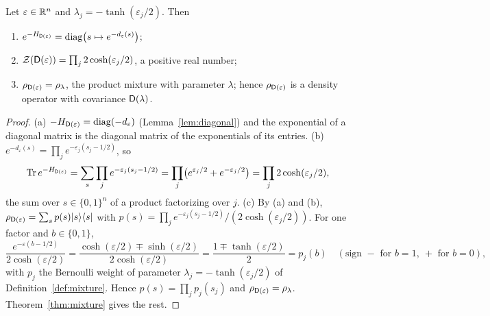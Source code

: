 \begin{lemma}\label{lem:block-exp}
Let $\varepsilon\in\mathbb R^n$ and $\lambda_j=-\tanh(\varepsilon_j/2)$. Then
\begin{enumerate}
\item[(a)] $e^{-H_{\mathsf D(\varepsilon)}}=\operatorname{diag}\bigl(s\mapsto e^{-d_\varepsilon(s)}\bigr)$;
\item[(b)] $\mathcal Z(\mathsf D(\varepsilon))=\prod_j2\cosh(\varepsilon_j/2)$, a positive real number;
\item[(c)] $\rho_{\mathsf D(\varepsilon)}=\rho_\lambda$, the product mixture with parameter
$\lambda$; hence $\rho_{\mathsf D(\varepsilon)}$ is a density operator with covariance $\mathsf D(\lambda)$.
\end{enumerate}
\end{lemma}
\begin{proof}
(a) $-H_{\mathsf D(\varepsilon)}=\operatorname{diag}(-d_\varepsilon)$ (Lemma~\ref{lem:diagonal}) and the
exponential of a diagonal matrix is the diagonal matrix of the exponentials of its entries.
(b) $e^{-d_\varepsilon(s)}=\prod_je^{-\varepsilon_j(s_j-1/2)}$, so
\[
 \operatorname{Tr} e^{-H_{\mathsf D(\varepsilon)}}=\sum_s\prod_je^{-\varepsilon_j(s_j-1/2)}
 =\prod_j\bigl(e^{\varepsilon_j/2}+e^{-\varepsilon_j/2}\bigr)=\prod_j2\cosh(\varepsilon_j/2),
\]
the sum over $s\in\{0,1\}^n$ of a product factorizing over $j$.
(c) By (a) and (b), $\rho_{\mathsf D(\varepsilon)}=\sum_sp(s)|s\rangle\langle s|$ with
$p(s)=\prod_je^{-\varepsilon_j(s_j-1/2)}/(2\cosh(\varepsilon_j/2))$. For one factor and
$b\in\{0,1\}$,
\[
 \frac{e^{-\varepsilon(b-1/2)}}{2\cosh(\varepsilon/2)}
 =\frac{\cosh(\varepsilon/2)\mp\sinh(\varepsilon/2)}{2\cosh(\varepsilon/2)}
 =\frac{1\mp\tanh(\varepsilon/2)}2=p_j(b)\quad(\text{sign }-\text{ for }b=1,\ +\text{ for }b=0),
\]
with $p_j$ the Bernoulli weight of parameter $\lambda_j=-\tanh(\varepsilon_j/2)$ of
Definition~\ref{def:mixture}. Hence $p(s)=\prod_jp_j(s_j)$ and
$\rho_{\mathsf D(\varepsilon)}=\rho_\lambda$. Theorem~\ref{thm:mixture} gives
the rest.
\end{proof}

